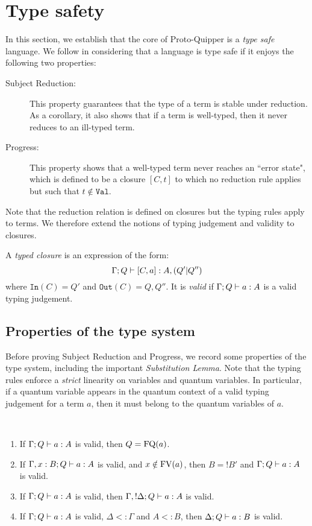 \documentclass[twoside]{article}
\begin{document}
\section{Type safety}\label{sec-type-safety}

In this section, we establish that the core of  Proto-Quipper 
is a \emph{type safe} language. We follow \cite{WrFe94} in 
considering that a language is type safe if it enjoys the 
following two properties: 
\begin{description}
  \item[Subject Reduction:] This property guarantees 
  that the type of a term is stable under reduction.
  As a corollary, it also shows that if a term is 
  well-typed, then it never reduces to an ill-typed 
  term.
  \item[Progress:] This property shows that a 
  well-typed term never reaches an ``error state", 
  which is defined to be a closure $[C,t]$ to which 
  no reduction rule applies but such that 
  $t\notin \mathtt{Val}$. 
\end{description}
Note that the reduction relation is defined on closures 
but the typing rules apply to terms. We therefore extend 
the notions of typing judgement and validity to closures.

\begin{definition}
A \emph{typed closure} is an expression of the form:
\[
\Gamma;Q\vdash [C,a]:A,(Q'|Q'')
\]
where $\mathtt{In}(C)=Q'$ and $\mathtt{Out}(C)=Q,Q''$. 
It is \emph{valid} if $\Gamma;Q\vdash a:A$ is a valid 
typing judgement.
\end{definition}

\subsection{Properties of the type system}

Before proving Subject Reduction and Progress, we record 
some properties of the type system, including the important 
\emph{Substitution Lemma}. Note that the typing rules 
enforce a \emph{strict} linearity on variables and quantum 
variables. In particular, if a quantum variable appears in 
the quantum context of a valid typing judgement for a term 
$a$, then it must belong to the quantum variables of $a$.

\begin{lemma}~
\label{prop_type_syst}
\begin{enumerate}
  \item If $\Gamma; Q \vdash a:A$ is valid, 
  then $Q=\mathop{\textrm{FQ}}\nolimits(a)$.\label{q_context}
  \item If $\Gamma,x:B;Q \vdash a:A$ is valid, 
  and $x\notin \mathop{\textrm{FV}}\nolimits(a)$, then $B=!B'$ and 
  $\Gamma;Q \vdash a:A$ is valid.\label{unused_var}
  \item If $\Gamma; Q \vdash a:A$ is valid, 
  then $\Gamma, !\Delta ; Q \vdash a:A$ is valid.\label{weakening}
  \item If $\Gamma ; Q \vdash a:A$ is valid, $\Delta <: \Gamma$
  and $A<:B$, then $\Delta ; Q \vdash a:B$ is valid.\label{subtype}
\end{enumerate}
\end{lemma}
\end{document}
